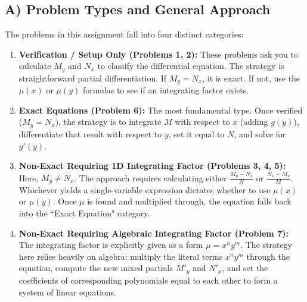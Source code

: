 \documentclass[11pt]{article}
\begin{document}
\subsection{A) Problem Types and General Approach}
The problems in this assignment fall into four distinct categories:
\begin{enumerate}
    \item \textbf{Verification / Setup Only (Problems 1, 2):} These problems ask you to calculate $M_y$ and $N_x$ to classify the differential equation. The strategy is straightforward partial differentiation. If $M_y = N_x$, it is exact. If not, use the $\mu(x)$ or $\mu(y)$ formulas to see if an integrating factor exists.
    \item \textbf{Exact Equations (Problem 6):} The most fundamental type. Once verified ($M_y = N_x$), the strategy is to integrate $M$ with respect to $x$ (adding $g(y)$), differentiate that result with respect to $y$, set it equal to $N$, and solve for $g'(y)$.
    \item \textbf{Non-Exact Requiring 1D Integrating Factor (Problems 3, 4, 5):} Here, $M_y \neq N_x$. The approach requires calculating either $\frac{M_y - N_x}{N}$ or $\frac{N_x - M_y}{M}$. Whichever yields a single-variable expression dictates whether to use $\mu(x)$ or $\mu(y)$. Once $\mu$ is found and multiplied through, the equation falls back into the ``Exact Equation" category.
    \item \textbf{Non-Exact Requiring Algebraic Integrating Factor (Problem 7):} The integrating factor is explicitly given as a form $\mu = x^n y^m$. The strategy here relies heavily on algebra: multiply the literal terms $x^n y^m$ through the equation, compute the new mixed partials $M'_y$ and $N'_x$, and set the coefficients of corresponding polynomials equal to each other to form a system of linear equations.
\end{enumerate}
\end{document}
